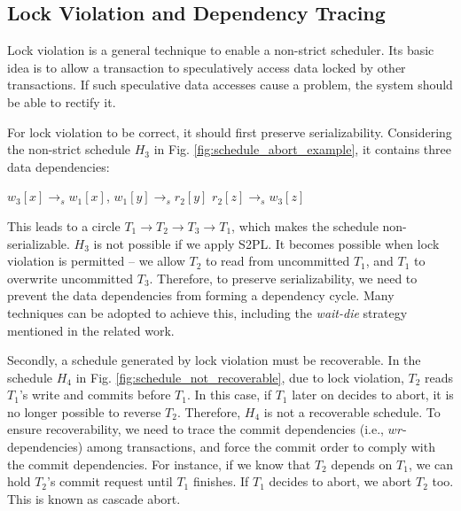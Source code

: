 \documentclass[conference]{IEEEtran}
\begin{document}

\subsection{Lock Violation and Dependency Tracing}

Lock violation is a general technique to enable a non-strict scheduler.
Its basic idea is to allow a transaction to speculatively access data locked by other transactions.
If such speculative data accesses cause a problem, the system should be able to rectify it.

For lock violation to be correct, it should first preserve serializability.
Considering the non-strict schedule ${H_3}$ in Fig. \ref{fig:schedule_abort_example},
it contains three data dependencies:

\begin{center}
${w_3[x] \rightarrow _s w_1[x]}$,
${w_1[y] \rightarrow _s r_2[y]}$
${r_2[z] \rightarrow _s w_3[z]}$
\end{center}

This leads to a circle ${T_1 \rightarrow T_2 \rightarrow T_3 \rightarrow T_1}$, which makes the schedule non-serializable.
${H_3}$ is not possible if we apply S2PL. It becomes possible when lock violation is permitted -- we allow
${T_2}$ to read from uncommitted ${T_1}$, and ${T_1}$ to overwrite uncommitted ${T_3}$.
Therefore, to preserve serializability, we need to prevent the data dependencies from forming a dependency cycle.
Many techniques can be adopted to achieve this, including the \emph{wait-die} strategy mentioned in the related work.

Secondly, a schedule generated by lock violation must be recoverable.
In the schedule ${H_4}$ in Fig.   \ref{fig:schedule_not_recoverable}, due to lock violation,
${T_2}$ reads  ${T_1}$'s write and commits before ${T_1}$.
In this case, if ${T_1}$ later on decides to abort, it is no longer possible to reverse ${T_2}$.
Therefore, ${H_4}$ is not a recoverable schedule.
To ensure recoverability, we need to trace the commit dependencies (i.e., $wr$-dependencies) among transactions, and force the commit order to comply with the commit dependencies.
For instance, if we know that ${T_2}$ depends on ${T_1}$, we can hold ${T_2}$'s commit request until ${T_1}$ finishes.
If ${T_1}$ decides to abort, we abort ${T_2}$ too. This is known as cascade abort. 
\end{document}
